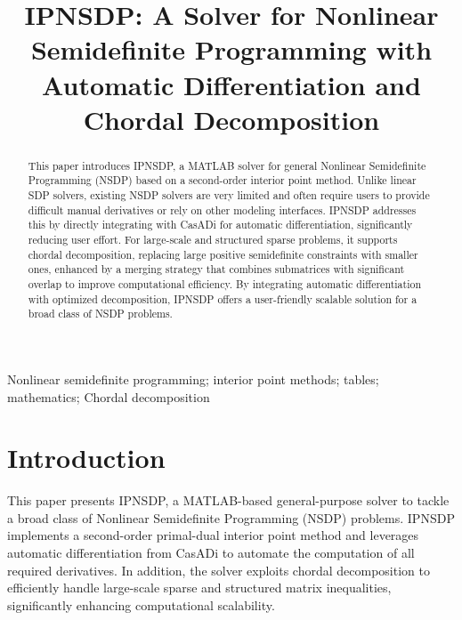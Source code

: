 \documentclass[]{interact}
\theoremstyle{plain}%
\theoremstyle{definition}
\theoremstyle{remark}
\begin{document}

\title{IPNSDP: A Solver for Nonlinear Semidefinite Programming with Automatic Differentiation and Chordal Decomposition}

\author{
}

\maketitle

\begin{abstract}
This paper introduces IPNSDP, a MATLAB solver for general Nonlinear Semidefinite Programming (NSDP) based on a second-order interior point method. Unlike linear SDP solvers, existing NSDP solvers are very limited and often require users to provide difficult manual derivatives or rely on other modeling interfaces. IPNSDP addresses this by directly integrating with CasADi for automatic differentiation, significantly reducing user effort. For large-scale and structured sparse problems, it supports chordal decomposition, replacing large positive semidefinite constraints with smaller ones, enhanced by a merging strategy that combines submatrices with significant overlap to improve computational efficiency. By integrating automatic differentiation with optimized decomposition, IPNSDP offers a user-friendly scalable solution for a broad class of NSDP problems.
\end{abstract}

\begin{keywords}
Nonlinear semidefinite programming;  interior point methods; tables; mathematics; Chordal decomposition

\end{keywords}


\section{Introduction}

This paper presents IPNSDP, a MATLAB-based general-purpose solver to tackle a broad class of Nonlinear Semidefinite Programming (NSDP) problems. IPNSDP implements a second-order primal-dual interior point method and leverages automatic differentiation from CasADi to automate the computation of all required derivatives. In addition, the solver exploits chordal decomposition to efficiently handle large-scale sparse and structured matrix inequalities, significantly enhancing computational scalability.
\end{document}

